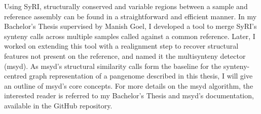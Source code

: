 
Using SyRI, structurally conserved and variable regions between a sample and reference assembly can be found in a straightforward and efficient manner.
In my Bachelor's Thesis supervised by Manish Goel, I developed a tool to merge SyRI's synteny calls across multiple samples called against a common reference.
Later, I worked on extending this tool with a realignment step to recover structural features not present on the reference, and named it the multisynteny detector (msyd).
As msyd's structural similarity calls form the baseline for the synteny-centred graph representation of a pangenome described in this thesis, I will give an outline of msyd's core concepts.
For more details on the msyd algorithm, the interested reader is referred to my Bachelor's Thesis and msyd's documentation, available in the GitHub repository.

